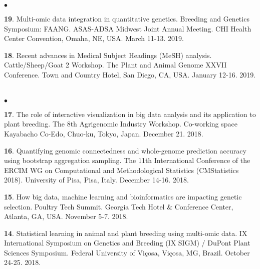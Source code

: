 \documentclass[margin,line,10pt]{res}
\newenvironment{list2}{
  \begin{list}{$\bullet$}{%
      \setlength{\itemsep}{0in}
      \setlength{\parsep}{0in} \setlength{\parskip}{0in}
      \setlength{\topsep}{0in} \setlength{\partopsep}{0in} 
      \setlength{\leftmargin}{0.2in}}}{\end{list}}
\begin{document}
\begin{resume}
\begin{list2}
    
   \vspace{0.5cm}
   
   \item [{\bf 19}.]  Multi-omic data integration in quantitative genetics. Breeding and Genetics Symposium: FAANG. ASAS-ADSA Midwest Joint Annual Meeting. CHI Health Center Convention, Omaha, NE, USA. March 11-13. 2019. 

  \vspace{0.5cm}

 \item [{\bf 18}.] Recent advances in Medical Subject Headings (MeSH) analysis. Cattle/Sheep/Goat 2 Workshop. The Plant and Animal Genome XXVII Conference. Town and Country Hotel, San Diego, CA, USA. January 12-16. 2019. 

\end{list2}

  
  
\section{}
\begin{list2}

  \item [{\bf 17}.] The role of interactive visualization in big data analysis and its application to plant breeding. The 8th Agrigenomic Industry Workshop. Co-working space Kayabacho Co-Edo, Chuo-ku, Tokyo, Japan. December 21. 2018. 

    \vspace{0.5cm}
    
   \item [{\bf 16}.] Quantifying genomic connectedness and whole-genome prediction accuracy using bootstrap aggregation sampling. The 11th International Conference of the ERCIM WG on Computational and Methodological Statistics (CMStatistics 2018). University of Pisa, Pisa, Italy. December 14-16. 2018. 

     \vspace{0.5cm}
     
    \item [{\bf 15}.] How big data, machine learning and bioinformatics are impacting genetic selection. Poultry Tech Summit. Georgia Tech Hotel \& Conference Center, Atlanta, GA, USA. November 5-7. 2018. 

      \vspace{0.5cm}
      
  \item [{\bf 14}.] Statistical learning in animal and plant breeding using multi-omic data. IX International Symposium on Genetics and Breeding (IX SIGM) / DuPont Plant Sciences Symposium.  Federal University of Vi\c cosa, Vi\c cosa, MG, Brazil. October 24-25. 2018.
  

\end{list2}
\end{resume}
\end{document}

